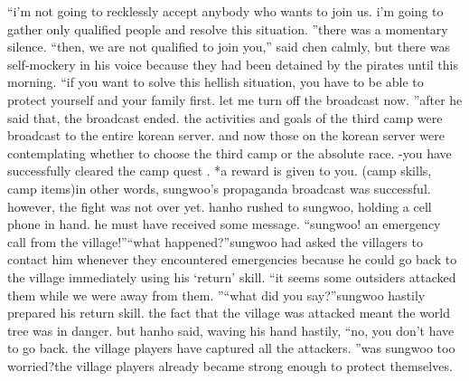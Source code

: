 “i’m not going to recklessly accept anybody who wants to join us.
 i’m going to gather only qualified people and resolve this situation.
”there was a momentary silence.
“then, we are not qualified to join you,” said chen calmly, but there was self-mockery in his voice because they had been detained by the pirates until this morning.
“if you want to solve this hellish situation, you have to be able to protect yourself and your family first.
 let me turn off the broadcast now.
”after he said that, the broadcast ended.
the activities and goals of the third camp were broadcast to the entire korean server.
 and now those on the korean server were contemplating whether to choose the third camp or the absolute race.
-you have successfully cleared the camp quest .
*a reward is given to you.
 (camp skills, camp items)in other words, sungwoo’s propaganda broadcast was successful.
however, the fight was not over yet.
hanho rushed to sungwoo, holding a cell phone in hand.
 he must have received some message.
“sungwoo! an emergency call from the village!”“what happened?”sungwoo had asked the villagers to contact him whenever they encountered emergencies because he could go back to the village immediately using his ‘return’ skill.
“it seems some outsiders attacked them while we were away from them.
”“what did you say?”sungwoo hastily prepared his return skill.
 the fact that the village was attacked meant the world tree was in danger.
but hanho said, waving his hand hastily, “no, you don’t have to go back.
 the village players have captured all the attackers.
”was sungwoo too worried?the village players already became strong enough to protect themselves.


 